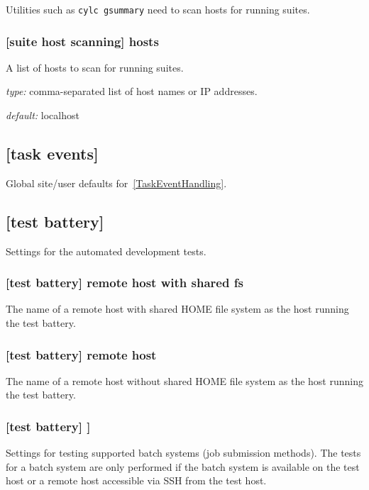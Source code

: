 Utilities such as \lstinline=cylc gsummary= need to scan hosts for
running suites.

\subsubsection[hosts]{[suite host scanning] \textrightarrow hosts }

A list of hosts to scan for running suites.
\begin{myitemize}
\item {\em type:} comma-separated list of host names or IP addresses.
\item {\em default:} localhost
\end{myitemize}

\subsection{[task events]}

Global site/user defaults for~\ref{TaskEventHandling}.

\subsection{[test battery]}

Settings for the automated development tests.

\subsubsection[remote host with shared fs]{[test battery] \textrightarrow remote host with shared fs}

The name of a remote host with shared HOME file system as the host running the
test battery.

\subsubsection[remote host with shared fs]{[test battery] \textrightarrow remote host}

The name of a remote host without shared HOME file system as the host running
the test battery.

\subsubsection[{[[}batch systems{]]}]{[test battery] \textrightarrow [[batch systems]]}

Settings for testing supported batch systems (job submission methods). The
tests for a batch system are only performed if the batch system is available on
the test host or a remote host accessible via SSH from the test host.

